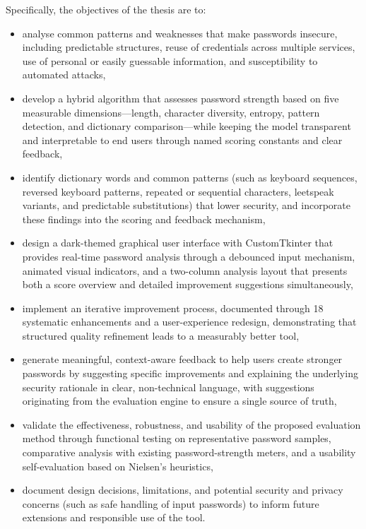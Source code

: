 Specifically, the objectives of the thesis are to:
\begin{itemize}
    \item analyse common patterns and weaknesses that make passwords insecure, including predictable structures, reuse of credentials across multiple services, use of personal or easily guessable information, and susceptibility to automated attacks,
    \item develop a hybrid algorithm that assesses password strength based on five measurable dimensions---length, character diversity, entropy, pattern detection, and dictionary comparison---while keeping the model transparent and interpretable to end users through named scoring constants and clear feedback,
    \item identify dictionary words and common patterns (such as keyboard sequences, reversed keyboard patterns, repeated or sequential characters, leetspeak variants, and predictable substitutions) that lower security, and incorporate these findings into the scoring and feedback mechanism,
    \item design a dark-themed graphical user interface with CustomTkinter that provides real-time password analysis through a debounced input mechanism, animated visual indicators, and a two-column analysis layout that presents both a score overview and detailed improvement suggestions simultaneously,
    \item implement an iterative improvement process, documented through 18 systematic enhancements and a user-experience redesign, demonstrating that structured quality refinement leads to a measurably better tool,
    \item generate meaningful, context-aware feedback to help users create stronger passwords by suggesting specific improvements and explaining the underlying security rationale in clear, non-technical language, with suggestions originating from the evaluation engine to ensure a single source of truth,
    \item validate the effectiveness, robustness, and usability of the proposed evaluation method through functional testing on representative password samples, comparative analysis with existing password-strength meters, and a usability self-evaluation based on Nielsen's heuristics,
    \item document design decisions, limitations, and potential security and privacy concerns (such as safe handling of input passwords) to inform future extensions and responsible use of the tool.
\end{itemize}

